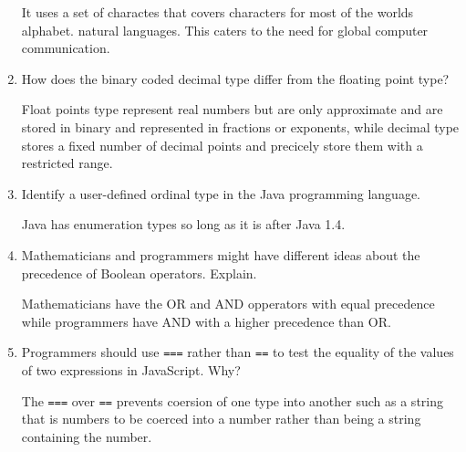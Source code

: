 \begin{enumerate}
  \begin{answer}

   It uses a set of charactes that covers characters for most of the
   worlds alphabet.  natural languages. This caters to the need for
   global computer communication.

    \end{answer}

  \item How does the binary coded decimal type differ from the
    floating point type?

  \begin{answer}

    Float points type represent real numbers but are only approximate
    and are stored in binary and represented in fractions or
    exponents, while decimal type stores a fixed number of decimal
    points and precicely store them with a restricted range.

    \end{answer}

  \item Identify a user-defined ordinal type in the Java programming
    language.

  \begin{answer}

    Java has enumeration types so long as it is after Java 1.4.

    \end{answer}

  \item Mathematicians and programmers might have different ideas
    about the precedence of Boolean operators. Explain.

  \begin{answer}

   Mathematicians have the OR and AND opperators with equal precedence
   while programmers have AND with a higher precedence than OR.

    \end{answer}

  \item Programmers should use \verb+===+ rather than \verb+==+ to
    test the equality of the values of two expressions in JavaScript. Why?

  \begin{answer}

    The \verb+===+ over \verb+==+ prevents coersion of one type into
    another such as a string that is numbers to be coerced into a
    number rather than being a string containing the number.


\end{answer}
\end{enumerate}
